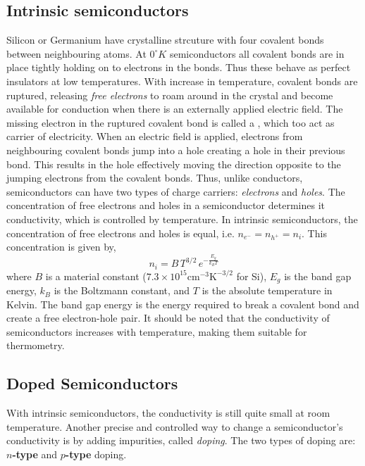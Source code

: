 \subsection{Intrinsic semiconductors}
Silicon or Germanium have crystalline strcuture with four covalent bonds between neighbouring atoms. At $0^\circ K$ semiconductors all covalent bonds are in place tightly holding on to electrons in the bonds. Thus these behave as perfect insulators at low temperatures. With increase in temperature, covalent bonds are ruptured, releasing \textit{free electrons} to roam around in the crystal and become available for conduction when there is an externally applied electric field. The missing electron in the ruptured covalent bond is called a , which too act as carrier of electricity. When an electric field is applied, electrons from neighbouring covalent bonds jump into a hole creating a hole in their previous bond. This results in the hole effectively moving the direction opposite to the jumping electrons from the covalent bonds. Thus, unlike conductors, semiconductors can have two types of charge carriers: \textit{electrons} and \textit{holes}. The concentration of free electrons and holes in a semiconductor determines it conductivity, which is controlled by temperature. In intrinsic semiconductors, the concentration of free electrons and holes is equal, i.e. $n_{e^-} = n_{h^+} = n_i$. This concentration is given by,
\begin{equation}
    n_i = B \, T^{3/2} \, e^{-\frac{E_g}{k_B T}}
    \label{eq:ch03-intrinsic-elec-conc}
\end{equation}
where $B$ is a material constant ($7.3 \times 10^15 \text{cm}^{-3}\text{K}^{-3/2}$ for Si), $E_g$ is the band gap energy, $k_B$ is the Boltzmann constant, and $T$ is the absolute temperature in Kelvin. The band gap energy is the energy required to break a covalent bond and create a free electron-hole pair. It should be noted that the conductivity of semiconductors increases with temperature, making them suitable for thermometry.

\subsection{Doped Semiconductors}
With intrinsic semiconductors, the conductivity is still quite small at room temperature. Another precise and controlled way to change a semiconductor's conductivity is by adding impurities, called \textit{doping}. The two types of doping are: \textbf{$n$-type} and \textbf{$p$-type} doping. 

